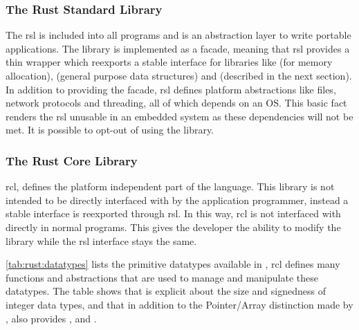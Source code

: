 \subsubsection{The Rust Standard Library}
\label{sec:rsl}

The \gls{rsl} is included into all {\rust} programs and is an abstraction layer to write portable applications.
The library is implemented as a facade, meaning that \gls{rsl} provides a thin wrapper which reexports a stable interface for libraries like  (for memory allocation),  (general purpose data structures) and {\core} (described in the next section).
In addition to providing the facade, \gls{rsl} defines platform abstractions like files, network protocols and threading, all of which depends on an OS.
This basic fact renders the \gls{rsl} unusable in an embedded system as these dependencies will not be met.
It is possible to opt-out of using the library.

\subsubsection{The Rust Core Library}
\label{sec:rcl}

\gls{rcl}, defines the platform independent part of the language.
This library is not intended to be directly interfaced with by the application programmer, instead a stable interface is reexported through \gls{rsl}.
In this way, \gls{rcl} is not interfaced with directly in normal {\rust} programs.
This gives the developer the ability to modify the library while the \gls{rsl} interface stays the same.

\autoref{tab:rust:datatypes} lists the primitive datatypes available in {\rust}, \gls{rcl} defines many functions and abstractions that are used to manage and manipulate these datatypes.
The table shows that {\rust} is explicit about the size and signedness of integer data types, and that in addition to the Pointer/Array distinction made by {\C}, {\rust} also provides ,  and .

